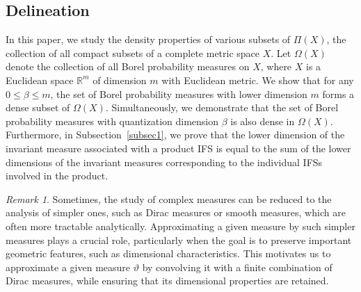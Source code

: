 \documentclass{amsproc}
\theoremstyle{definition}
\theoremstyle{remark}
\newtheorem{remark}[theorem]{Remark}
\numberwithin{equation}{section}
\begin{document}
\subsection{Delineation} In this paper, we study the density properties of various subsets of $\Pi(X)$, the collection of all compact subsets of a complete metric space $X$. Let $\Omega(X)$ denote the collection of all Borel probability measures on $X$, where $X$ is a Euclidean space $\mathbb{R}^m$ of dimension $m$ with Euclidean metric. We show that for any $0 \le \beta \le m$, the set of Borel probability measures with lower dimension $m$ forms a dense subset of $\Omega(X)$. Simultaneously, we demonstrate that the set of Borel probability measures with quantization dimension $\beta$ is also dense in $\Omega(X)$. Furthermore, in Subsection~\ref{subsec1}, we prove that the lower dimension of the invariant measure associated with a product IFS is equal to the sum of the lower dimensions of the invariant measures corresponding to the individual IFSs involved in the product.
\\

\begin{remark}
Sometimes, the study of complex measures can be reduced to the analysis of simpler ones, such as Dirac measures or smooth measures, which are often more tractable analytically. Approximating a given measure by such simpler measures plays a crucial role, particularly when the goal is to preserve important geometric features, such as dimensional characteristics. This motivates us to approximate a given measure $\vartheta$ by convolving it with a finite combination of Dirac measures, while ensuring that its dimensional properties are retained.
\end{remark}
 
\end{document}
